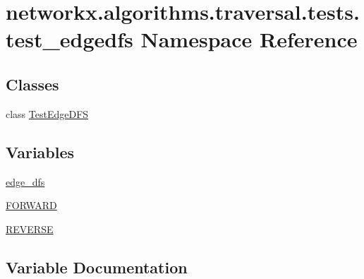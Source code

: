 \hypertarget{namespacenetworkx_1_1algorithms_1_1traversal_1_1tests_1_1test__edgedfs}{}\section{networkx.\+algorithms.\+traversal.\+tests.\+test\+\_\+edgedfs Namespace Reference}
\label{namespacenetworkx_1_1algorithms_1_1traversal_1_1tests_1_1test__edgedfs}
\subsection*{Classes}
\begin{DoxyCompactItemize}
\item 
class \hyperlink{classnetworkx_1_1algorithms_1_1traversal_1_1tests_1_1test__edgedfs_1_1TestEdgeDFS}{Test\+Edge\+D\+FS}
\end{DoxyCompactItemize}
\subsection*{Variables}
\begin{DoxyCompactItemize}
\item 
\hyperlink{namespacenetworkx_1_1algorithms_1_1traversal_1_1tests_1_1test__edgedfs_ac4eadfc80eabad8ebdb7c07b437a0efc}{edge\+\_\+dfs}
\item 
\hyperlink{namespacenetworkx_1_1algorithms_1_1traversal_1_1tests_1_1test__edgedfs_af30340982b143da3b613bf2a23091f89}{F\+O\+R\+W\+A\+RD}
\item 
\hyperlink{namespacenetworkx_1_1algorithms_1_1traversal_1_1tests_1_1test__edgedfs_ad4e21d7f29f24fd499b4b07681c69695}{R\+E\+V\+E\+R\+SE}
\end{DoxyCompactItemize}


\subsection{Variable Documentation}
\mbox{\label{namespacenetworkx_1_1algorithms_1_1traversal_1_1tests_1_1test__edgedfs_ac4eadfc80eabad8ebdb7c07b437a0efc}} 
